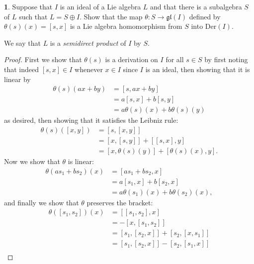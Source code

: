 \documentclass[12pt]{article}
\newcommand{\gl}{\mathfrak{gl}}
\theoremstyle{definition}
\newtheorem{ex}{}
\begin{document}
\begin{ex}
	Suppose that $I$ is an ideal of a Lie algebra $L$ and that there is a subalgebra $S$ of $L$ such that $L = S \oplus I$.
	Show that the map $\theta : S \to \gl(I)$ defined by $\theta(s)(x) = [s, x]$ is a Lie algebra homomorphism from $S$ into $\mathrm{Der}(I)$.

	We say that $L$ is a \textit{semidirect product} of $I$ by $S$.
\end{ex}
\begin{proof}
	First we show that $\theta(s)$ is a derivation on $I$ for all $s \in S$ by first noting that indeed $[s, x] \in I$ whenever $x \in I$ since $I$ is an ideal, then showing that it is linear by \begin{align*}
		\theta(s)(ax + by) & = [s, ax + by]                  \\
		                   & = a[s, x] + b[s, y]             \\
		                   & = a\theta(s)(x) + b\theta(s)(y)
	\end{align*}
	as desired, then showing that it satisfies the Leibniz rule: \begin{align*}
		\theta(s)([x, y]) & = [s, [x, y]]                            \\
		                  & = [x, [s, y]] + [[s, x], y]              \\
		                  & = [x, \theta(s)(y)] + [\theta(s)(x), y].
	\end{align*}
	Now we show that $\theta$ is linear: \begin{align*}
		\theta(as_1 + bs_2)(x) & = [as_1 + bs_2, x]                   \\
		                       & = a[s_1, x] + b[s_2, x]              \\
		                       & = a\theta(s_1)(x) + b\theta(s_2)(x),
	\end{align*}
	and finally we show that $\theta$ preserves the bracket: \begin{align*}
		\theta([s_1, s_2])(x) & = [[s_1, s_2], x]                                                     \\
		                      & = -[x, [s_1, s_2]]                                                    \\
		                      & = [s_1, [s_2, x]] + [s_2, [x, s_1]]                                   \\
		                      & = [s_1, [s_2, x]] - [s_2, [s_1, x]]                                   \\

\end{align*}
\end{proof}
\end{document}
